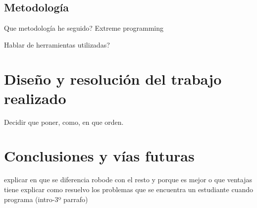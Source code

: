 \section{Metodología}
\label{sec:metodologia}

{\color{green}
Que metodología he seguido? Extreme programming


Hablar de herramientas utilizadas?
}

\chapter{Diseño y resolución del trabajo realizado}\label{diseno}


{\color{green}
Decidir que poner, como, en que orden.
}



\chapter{Conclusiones y vías futuras}\label{conslusiones}




{\color{blue}
explicar en que se diferencia robode con el resto y porque es mejor o que ventajas tiene
explicar como resuelvo los problemas que se encuentra un estudiante cuando programa (intro-3º parrafo)
}
